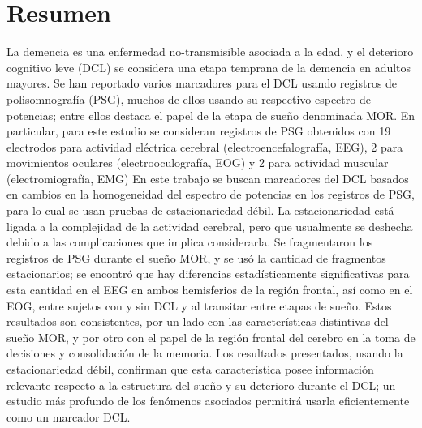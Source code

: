 \documentclass[12pt,letterpaper]{book}
\begin{document}
\setcounter{page}{1}



\chapter*{Resumen}

\begin{small}
La demencia es una enfermedad no-transmisible asociada a la edad, y el deterioro cognitivo leve (DCL) se considera una etapa temprana de la demencia en adultos mayores.
%
Se han reportado varios marcadores para el DCL usando registros de polisomnografía (PSG), muchos de ellos usando su respectivo espectro de potencias; entre ellos destaca el papel de la etapa de sueño denominada MOR. 
%
En particular, para este estudio se consideran registros de PSG obtenidos con 19 electrodos para actividad eléctrica cerebral (electroencefalografía, EEG), 2 para movimientos oculares (electrooculografía, EOG) y 2 para actividad muscular (electromiografía, EMG)
%
En este trabajo se buscan marcadores del DCL basados en cambios en la homogeneidad del espectro de potencias en los registros de PSG, para lo cual se usan pruebas de estacionariedad débil.
%
La estacionariedad está ligada a la complejidad de la actividad cerebral, pero que usualmente se deshecha debido a las complicaciones que implica considerarla. 
%
Se fragmentaron los registros de PSG durante el sueño MOR, y se usó la cantidad de fragmentos estacionarios; se encontró que hay diferencias estadísticamente significativas para esta cantidad en el EEG en ambos hemisferios de la región frontal, así como en el EOG, entre sujetos con y sin DCL y al transitar entre etapas de sueño.
%
Estos resultados son consistentes, por un lado con las características distintivas del sueño MOR, y por otro con el papel de la región frontal del cerebro en la toma de decisiones y consolidación de la memoria.
%
Los resultados presentados, usando la estacionariedad débil, confirman que esta característica posee información relevante respecto a la estructura del sueño y su deterioro durante el DCL; un estudio más profundo de los fenómenos asociados permitirá usarla eficientemente como un marcador DCL.
\end{small}
\end{document}
